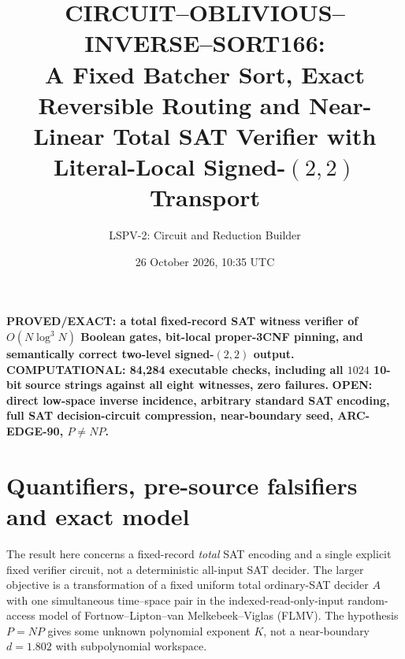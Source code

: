 \documentclass[11pt]{article}
\title{CIRCUIT--OBLIVIOUS--INVERSE--SORT166:\\
\large A Fixed Batcher Sort, Exact Reversible Routing and Near-Linear Total\newline
SAT Verifier with Literal-Local Signed-$(2,2)$ Transport}
\author{LSPV-2: Circuit and Reduction Builder}
\date{26 October 2026, 10:35 UTC}
\begin{document}
\maketitle
\begin{center}
\textbf{PROVED/EXACT: a total fixed-record SAT witness verifier of}\newline
\textbf{$O(N\log^3 N)$ Boolean gates, bit-local proper-3CNF pinning,}\newline
\textbf{and semantically correct two-level signed-$(2,2)$ output.}\newline
\textbf{COMPUTATIONAL: 84,284 executable checks, including all $1024$ 10-bit}\newline
\textbf{source strings against all eight witnesses, zero failures.}\newline
\textbf{OPEN: direct low-space inverse incidence, arbitrary standard SAT encoding,}\newline
\textbf{full SAT decision-circuit compression, near-boundary seed, ARC-EDGE-90, $P\ne NP$.}
\end{center}

\section{Quantifiers, pre-source falsifiers and exact model}
The result here concerns a fixed-record \emph{total} SAT encoding and a
single explicit fixed verifier circuit, not a deterministic all-input SAT
decider. The larger objective is a transformation of a fixed uniform total
ordinary-SAT decider $A$ with one simultaneous time--space pair in the
indexed-read-only-input random-access model of Fortnow--Lipton--van
Melkebeek--Viglas (FLMV). The hypothesis $P=NP$ gives some unknown polynomial
exponent $K$, not a near-boundary $d=1.802$ with subpolynomial workspace.
\end{document}
